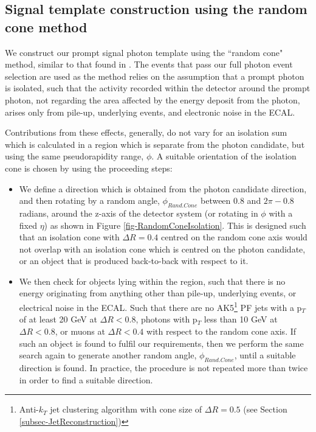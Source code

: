 \subsection{Signal template construction using the random cone method}

We construct our prompt signal photon template using the ``random cone" method, similar to that found in \cite{diffxsectdiphoton}. The events that pass our full photon event selection are used as the method relies on the assumption that a prompt photon is isolated, such that the activity recorded within the detector around the prompt photon, not regarding the area affected by the energy deposit from the photon, arises only from pile-up, underlying events, and electronic noise in the ECAL.  

Contributions from these effects, generally, do not vary for an isolation sum which is calculated in a region which is separate from the photon candidate, but using the same pseudorapidity range, $\phi$. A suitable orientation of the isolation cone is chosen by using the proceeding steps:

\begin{itemize}
	\item We define a direction which is obtained from the photon candidate direction, and then rotating by a random angle, $\phi_{Rand.Cone}$ between $0.8$ and $2\pi - 0.8$ radians, around the z-axis of the detector system (or rotating in $\phi$ with a fixed $\eta$) as shown in Figure \ref{fig-RandomConeIsolation}. This is designed such that an isolation cone with $\Delta R = 0.4$ centred on the random cone axis would not overlap with an isolation cone which is centred on the photon candidate, or an object that is produced back-to-back with respect to it.
	\item We then check for objects lying within the region, such that there is no energy originating from anything other than pile-up, underlying events, or electrical noise in the ECAL. Such that there are no AK5\footnote{Anti-$k_T$ jet clustering algorithm with cone size of $\Delta R = 0.5$ (see Section \ref{subsec-JetReconstruction})} PF jets with a p$_T$ of at least 20 GeV at $\Delta R < 0.8$, photons with p$_T$ less than 10 GeV at $\Delta R < 0.8$, or muons at $\Delta R < 0.4$ with respect to the random cone axis. If such an object is found to fulfil our requirements, then we perform the same search again to generate another random angle, $\phi_{Rand.Cone}$, until a suitable direction is found. In practice, the procedure is not repeated more than twice in order to find a suitable direction.   
\end{itemize}

